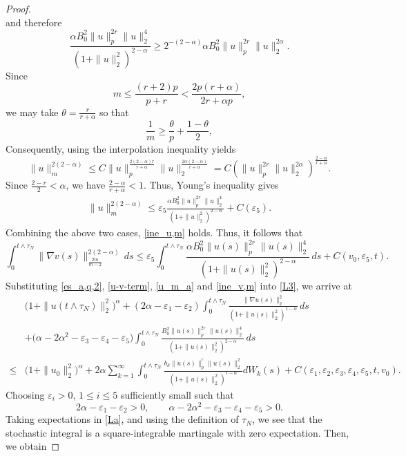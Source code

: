 \documentclass[reqno, 11pt]{amsart}
\theoremstyle{definition}
\numberwithin{equation}{section} \numberwithin{lem}{section}
\numberwithin{thm}{section} \numberwithin{prop}{section}
\numberwithin{cor}{section} \numberwithin{rem}{section}
\numberwithin{defn}{section}
\begin{document}
\begin{proof}
\[	\]
	and therefore
	\[
	\frac{\alpha{B_0^2}\|u\|_p^{2r}\|u\|_2^4}{(1+\|u\|_2^2)^{2-\alpha}}
	\ge
	2^{-(2-\alpha)}\alpha{B_0^2}\|u\|_p^{2r}\|u\|_2^{2\alpha}.
	\]
	Since
	\[
	m\le \frac{(r+2)p}{p+r}<\frac{2p(r+\alpha)}{2r+\alpha p},
	\]
	we may take $\theta=\frac{r}{r+\alpha}$ so that
	\[
	\frac1m\ge \frac{\theta}{p}+\frac{1-\theta}{2},
	\]
	Consequently, using the interpolation inequality yields
	\[
	\|u\|_m^{2(2-\alpha)}
	\le
	C\|u\|_p^{\frac{2(2-\alpha)r}{r+\alpha}}
	\|u\|_2^{\frac{2\alpha(2-\alpha)}{r+\alpha}}
	=
	C(\|u\|_p^{2r}\|u\|_2^{2\alpha})^{\frac{2-\alpha}{r+\alpha}}.
	\]
	Since $\frac{2-r}{2}<\alpha$, we have $\frac{2-\alpha}{r+\alpha}<1.$
	Thus, Young's inequality  gives
	\begin{align}
	    \|u\|_m^{2(2-\alpha)}
	\le
	\varepsilon_5\frac{\alpha{B_0^2}\|u\|_p^{2r}\|u\|_2^4}{(1+\|u\|_2^2)^{2-\alpha}}
	+
	C(\varepsilon_5).
	\end{align}
	Combining the above two cases, \eqref{ine_u,m} holds.
Thus, it follows  that
\begin{equation}
		\label{ine_v,m}
		\int_0^{t\wedge{\tau_N}}\|\nabla v(s)\|_{\frac{2m}{m-2}}^{2(2-\alpha)}\,ds
		\le
\varepsilon_5\int_0^{t\wedge{\tau_N}}\frac{\alpha{B_0^2}\|u(s)\|_p^{2r}\|u(s)\|_2^4}{(1+\|u(s)\|_2^2)^{2-\alpha}}\,ds+C(v_0,\varepsilon_5,t).
	\end{equation}
	Substituting  \eqref{es_a,q,2}, \eqref{u-v-term}, \eqref{u_m_a} and  \eqref{ine_v,m}
	into \eqref{L3}, we arrive at
	\begin{align}
		\label{La}
		\nonumber&\big(1+\|u(t\wedge{\tau_N})\|_2^2\big)^\alpha
		+(2\alpha-\varepsilon_1-\varepsilon_2)\int_0^{t\wedge{\tau_N}}
		\frac{\|\nabla u(s)\|_2^2}{(1+\|u(s)\|_2^2)^{1-\alpha}}\,ds\\\nonumber&+\bigl(\alpha-2\alpha^2-\varepsilon_3-\varepsilon_4-\varepsilon_5\bigr)
		\int_0^{t\wedge{\tau_N}}
		\frac{{B_0^2}\|u(s)\|_p^{2r}\|u(s)\|_2^4}
		{(1+\|u(s)\|_2^2)^{2-\alpha}}\,ds
		\nonumber\\
		\le&\big(1+\|u_0\|_2^2\big)^\alpha+2\alpha\sum_{k=1}^\infty\int_0^{t\wedge{\tau_N}}
		\frac{b_k\|u(s)\|_p^r\|u(s)\|_2^2}{(1+\|u(s)\|_2^2)^{1-\alpha}}dW_k(s)
		+C(\varepsilon_1, \varepsilon_2,\varepsilon_3,\varepsilon_4,\varepsilon_5,t,v_0).
	\end{align}
    Choosing $\varepsilon_i>0$, $1\le i\le 5$ sufficiently small such that
	\[
	2\alpha-\varepsilon_1-\varepsilon_2>0,
	\qquad
	\alpha-2\alpha^2-\varepsilon_3-\varepsilon_4-\varepsilon_5>0.
	\]
	Taking expectations in \eqref{La}, and using the definition of $\tau_N$, we see that the stochastic integral is a square-integrable  martingale with zero expectation. Then, we obtain

\end{proof}
\end{document}
